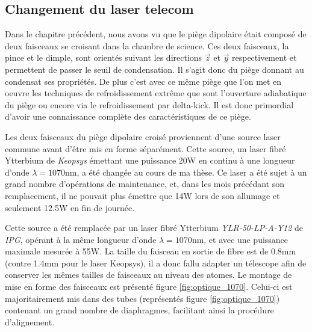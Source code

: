 \subsection{Changement du laser telecom}
Dans le chapitre précédent, nous avons vu que le piège dipolaire était composé de deux faisceaux se croisant dans la chambre de science. Ces deux faisceaux, la pince et le dimple, sont orientés suivant les directions $\vec{z}$ et $\vec{y}$ respectivement et permettent de passer le seuil de condensation. Il s'agit donc du piège donnant au condensat ses propriétés. De plus c'est avec ce même piège que l'on met en oeuvre les techniques de refroidissement extrême que sont l'ouverture adiabatique du piège ou encore via le refroidissement par delta-kick. Il est donc primordial d'avoir une connaissance complète des caractéristiques de ce piège.

Les deux faisceaux du piège dipolaire croisé proviennent d'une source laser commune avant d'être mis en forme séparément. Cette source, un laser fibré Ytterbium de \emph{Keopsys} émettant une puissance 20W en continu à une longueur d'onde $\lambda=1070$nm, a été changée au cours de ma thèse. Ce laser a été sujet à un grand nombre d'opérations de maintenance, et, dans les mois précédant son remplacement, il ne pouvait plus émettre que 14W lors de son allumage et seulement 12.5W en fin de journée.
 
Cette source a été remplacée par un laser fibré Ytterbium \emph{YLR-50-LP-A-Y12} de \emph{IPG}, opérant à la même longueur d'onde $\lambda=1070$nm, et avec une puissance maximale mesurée à 55W. La taille du faisceau en sortie de fibre est de 0.8mm (contre 1.4mm pour le laser Keopsys), il a donc fallu adapter un télescope afin de conserver les mêmes tailles de faisceaux au niveau des atomes. Le montage de mise en forme des faisceaux est présenté figure \ref{fig:optique_1070}. Celui-ci est majoritairement mis dans des tubes (représentés figure \ref{fig:optique_1070}) contenant un grand nombre de diaphragmes, facilitant ainsi la procédure d'alignement.

